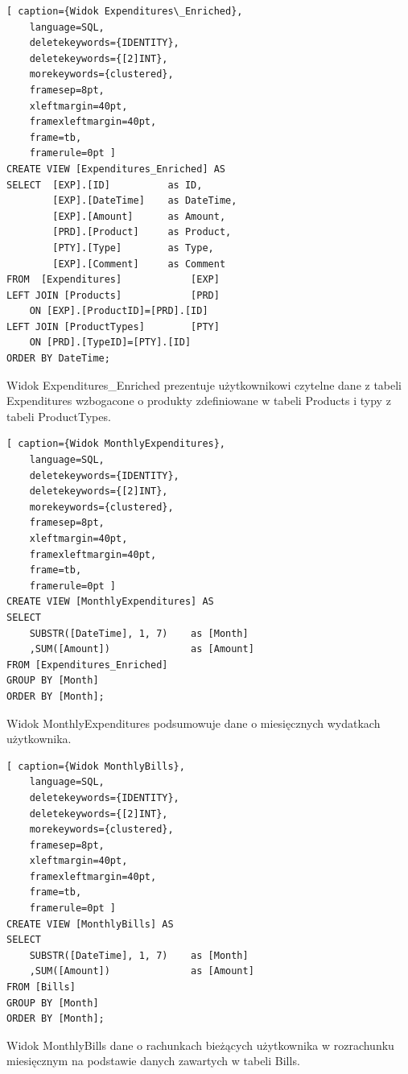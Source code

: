 \documentclass[a4paper,10pt, twoside]{report}
\begin{document}
\begin{minipage}{\textwidth}
\begin{lstlisting}[ caption={Widok Expenditures\_Enriched},
    language=SQL,
    deletekeywords={IDENTITY},
    deletekeywords={[2]INT},
    morekeywords={clustered},
    framesep=8pt,
    xleftmargin=40pt,
    framexleftmargin=40pt,
    frame=tb,
    framerule=0pt ]
CREATE VIEW [Expenditures_Enriched] AS
SELECT  [EXP].[ID]          as ID,
        [EXP].[DateTime]    as DateTime,
        [EXP].[Amount]      as Amount,
        [PRD].[Product]     as Product,
        [PTY].[Type]        as Type,
        [EXP].[Comment]     as Comment
FROM  [Expenditures]            [EXP]
LEFT JOIN [Products]            [PRD]	
    ON [EXP].[ProductID]=[PRD].[ID]
LEFT JOIN [ProductTypes]        [PTY]
    ON [PRD].[TypeID]=[PTY].[ID]
ORDER BY DateTime;
\end{lstlisting}
{Widok Expenditures\_Enriched prezentuje użytkownikowi czytelne dane z tabeli 
Expenditures wzbogacone o produkty zdefiniowane w tabeli Products i typy z 
tabeli ProductTypes.}
\end{minipage}

\begin{minipage}{\textwidth}
\begin{lstlisting}[ caption={Widok MonthlyExpenditures},
    language=SQL,
    deletekeywords={IDENTITY},
    deletekeywords={[2]INT},
    morekeywords={clustered},
    framesep=8pt,
    xleftmargin=40pt,
    framexleftmargin=40pt,
    frame=tb,
    framerule=0pt ]
CREATE VIEW [MonthlyExpenditures] AS
SELECT 
    SUBSTR([DateTime], 1, 7)    as [Month]
    ,SUM([Amount])              as [Amount]
FROM [Expenditures_Enriched]
GROUP BY [Month]
ORDER BY [Month];
\end{lstlisting}
{Widok MonthlyExpenditures podsumowuje dane o miesięcznych wydatkach użytkownika.}
\end{minipage}

\begin{minipage}{\textwidth}
\begin{lstlisting}[ caption={Widok MonthlyBills},
    language=SQL,
    deletekeywords={IDENTITY},
    deletekeywords={[2]INT},
    morekeywords={clustered},
    framesep=8pt,
    xleftmargin=40pt,
    framexleftmargin=40pt,
    frame=tb,
    framerule=0pt ]
CREATE VIEW [MonthlyBills] AS
SELECT 
    SUBSTR([DateTime], 1, 7)    as [Month]
    ,SUM([Amount])              as [Amount]
FROM [Bills]
GROUP BY [Month]
ORDER BY [Month];
\end{lstlisting}
{Widok MonthlyBills dane o rachunkach bieżących użytkownika w rozrachunku 
miesięcznym na podstawie danych zawartych w tabeli Bills.}
\end{minipage}
\end{document}
